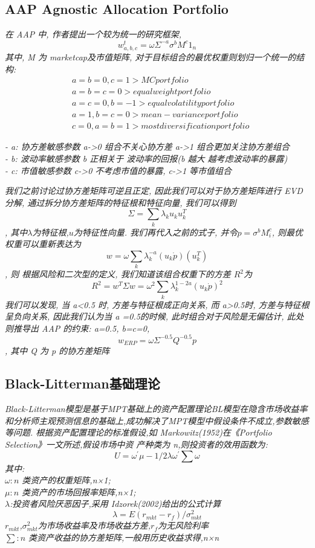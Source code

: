 \documentclass{scrartcl}
\numberwithin{equation}{section}   %
\begin{document}
\subsection{AAP Agnostic Allocation Portfolio}
\textsl{在 AAP 中, 作者提出一个较为统一的研究框架, $$w_{a,b,c}^t = \omega \Sigma^{-a}\sigma^bM^c1_n$$其中, M 为 marketcap及市值矩阵, 对于目标组合的最优权重则划归一个统一的结构:}
\begin{equation*}
    \begin{aligned}
         & a=b=0 , c=1 > MC portfolio                  \\
         & a=b=c=0 > equal weight portfolio            \\
         & a=c=0, b=-1  > equal volatility portfolio   \\
         & a=1, b=c=0 > mean-variance portfolio        \\
         & c=0, a=b=1 > most diversification portfolio
    \end{aligned}
\end{equation*}

\textsl{
    - a: 协方差敏感参数 a->0 组合不关心协方差  a->1 组合更加关注协方差组合\\
    - b: 波动率敏感参数 b 正相关于 波动率的回报(b 越大 越考虑波动率的暴露) \\
    - c: 市值敏感参数  c->0  不考虑市值的暴露,  c->1 等市值组合
}

\textsl{
    我们之前讨论过协方差矩阵可逆且正定, 因此我们可以对于协方差矩阵进行 EVD分解, 通过拆分协方差矩阵的特征根和特征向量, 我们可以得到$$\Sigma = \sum_k\lambda_ku_ku_k^T$$, 其中$\lambda$为特征根,$u$为特征性向量. 我们再代入之前的式子, 并令$p=\sigma^bM_i^c$, 则最优权重可以重新表达为$$w = \omega \sum_k \lambda_k^{-a} (u_k  \dot p)(u_k^T)$$, 则 根据风险和二次型的定义, 我们知道该组合权重下的方差 $R^2 $为  $$R^2 = w^T \Sigma w = \omega^2\sum_k \lambda_k^{1-2a}(u_k \dot p)^2$$我们可以发现, 当 a<0.5 时, 方差与特征根成正向关系, 而 a>0.5时, 方差与特征根呈负向关系, 因此我们认为当 a =0.5的时候, 此时组合对于风险是无偏估计, 此处则推导出 AAP 的约束: a=0.5, b=c=0, $$w_{ERP}= \omega \Sigma^{-0.5} Q^{-0.5} p $$, 其中 Q 为 p 的协方差矩阵
}



\subsection{Black-Litterman基础理论}
\textsl{Black-Litterman模型是基于MPT基础上的资产配置理论BL模型在隐含市场收益率和分析师主观预测信息的基础上,成功解决了MPT模型中假设条件不成立,参数敏感等问题.
根据资产配置理论的标准假设,如 Markowitz(1952)在《Portfolio Selection》一文所述,假设市场中资
产种类为 n,则投资者的效用函数为:
$$U=\omega^{'}\mu- 1/2 \lambda \omega^{'} \sum \omega $$
其中:\\
$\omega:n$ 类资产的权重矩阵,n×1;\\
$\mu:n$ 类资产的市场回报率矩阵,n×1; \\
$\lambda$:投资者风险厌恶因子,采用 Idzorek(2002)给出的公式计算
$$\lambda=E(r_{mkt} -r_f)/\sigma^2_{mkt}$$
$r_{mkt}$,$\sigma^2_{mkt}$为市场收益率及市场收益方差,$r_f$为无风险利率\\
$\sum:n$ 类资产收益的协方差矩阵,一般用历史收益求得,n×n
}
\end{document}
